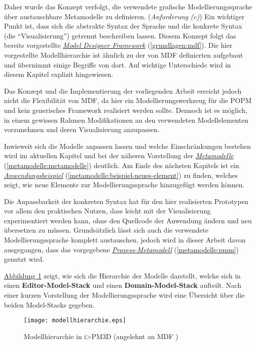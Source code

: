 \documentclass[a4paper,10pt]{sphinxmanual}
\begin{document}
Daher wurde das Konzept verfolgt, die verwendete grafische Modellierungssprache über austauschbare Metamodelle zu definieren. (\emph{Anforderung (c)})
Ein wichtiger Punkt ist, dass sich die abstrakte Syntax der Sprache und die konkrete Syntax (die "`Visualisierung"') getrennt beschreiben lassen.
Diesem Konzept folgt das bereits vorgestellte {\hyperref[grundlagen:mdf]{\emph{Model Designer Framework}}} (\autoref*{grundlagen:mdf}).
Die hier vorgestellte Modellhierarchie ist ähnlich zu der von MDF definierten aufgebaut und übernimmt einige Begriffe von dort.
Auf wichtige Unterschiede wird in diesem Kapitel explizit hingewiesen.

Das Konzept und die Implementierung der vorliegenden Arbeit erreicht jedoch nicht die Flexibilität von MDF, da hier ein Modellierungswerkzeug für die POPM und kein generisches Framework realisiert werden sollte.
Dennoch ist es möglich, in einem gewissen Rahmen Modifikationen an den verwendeten Modellelementen vorzunehmen und deren Visualisierung anzupassen.

Inwieweit sich die Modelle anpassen lassen und welche Einschränkungen bestehen wird im aktuellen Kapitel und bei der näheren Vorstellung der {\hyperref[metamodelle:metamodelle]{\emph{Metamodelle}}} (\autoref*{metamodelle:metamodelle}) deutlich.
Am Ende des nächsten Kapitels ist ein {\hyperref[metamodelle:beispiel-neues-element]{\emph{Anwendungsbeispiel}}} (\autoref*{metamodelle:beispiel-neues-element}) zu finden, welches zeigt, wie neue Elemente zur Modellierungssprache hinzugefügt werden können.

Die Anpassbarkeit der konkreten Syntax hat für den hier realisierten Prototypen vor allem den praktischen Nutzen, dass leicht mit der Visualisierung experimentiert werden kann, ohne den Quellcode der Anwendung ändern und neu übersetzen zu müssen.
Grundsätzlich lässt sich auch die verwendete Modellierungssprache komplett austauschen, jedoch wird in dieser Arbeit davon ausgegangen, dass das vorgegebene {\hyperref[metamodelle:pmm]{\emph{Prozess-Metamodell}}} (\autoref*{metamodelle:pmm}) genutzt wird.

\hyperref[modellhierarchie:modellhierarchie-diagram]{Abbildung  \ref*{modellhierarchie:modellhierarchie-diagram}} zeigt, wie sich die Hierarchie der Modelle darstellt, welche sich in einen \textbf{Editor-Model-Stack} und einen \textbf{Domain-Model-Stack} aufteilt.
Nach einer kurzen Vorstellung der Modellierungssprache wird eine Übersicht über die beiden Model-Stacks gegeben.
\begin{figure}[htbp]
\centering
\capstart

\texttt{[image: modellhierarchie.eps]}
\caption{Modellhierarchie in i\textgreater{}PM3D (angelehnt an MDF \cite{roth_konzeption_2011})}\label{modellhierarchie:modellhierarchie-diagram}\end{figure}
\end{document}
